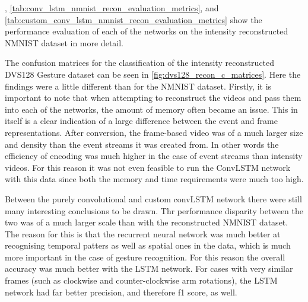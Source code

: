 , \cref{tab:conv_lstm_nmnist_recon_evaluation_metrics}, and \cref{tab:custom_conv_lstm_nmnist_recon_evaluation_metrics} show the performance evaluation of each of the networks on the intensity reconstructed NMNIST dataset in more detail.

\vspace{10pt}

The confusion matrices for the classification of the intensity reconstructed DVS128 Gesture dataset can be seen in \cref{fig:dvs128_recon_c_matrices}. Here the findings were a little different than for the NMNIST dataset. Firstly, it is important to note that when attempting to reconstruct the videos and pass them into each of the networks, the amount of memory often became an issue. This in itself is a clear indication of a large difference between the event and frame representations. After conversion, the frame-based video was of a much larger size and density than the event streams it was created from. In other words the efficiency of encoding was much higher in the case of event streams than intensity videos. For this reason it was not even feasible to run the ConvLSTM network with this data since both the memory and time requirements were much too high.

Between the purely convolutional and custom convLSTM network there were still many interesting conclusions to be drawn. Thr performance disparity between the two was of a much larger scale than with the reconstructed NMNIST dataset. The reason for this is that the recurrent neural network was much better at recognising temporal patters as well as spatial ones in the data, which is much more important in the case of gesture recognition. For this reason the overall accuracy was much better with the LSTM network. For cases with very similar frames (such as clockwise and counter-clockwise arm rotations), the LSTM network had far better precision, and therefore f1 score, as well.

